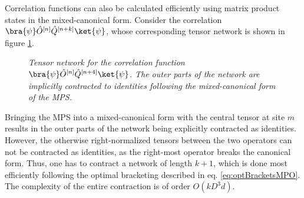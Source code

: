 Correlation functions can also be calculated efficiently using matrix product states in the mixed-canonical form. Consider the correlation $\bra{\psi} \hat{O}^{[n]} \hat{Q}^{[n+k]} \ket{\psi}$, whose corresponding tensor network is shown in figure \ref{fig:CorrelationFunction}.
\begin{figure}[h!]
	\centering
	
	\caption{\textit{Tensor network for the correlation function $\bra{\psi} \hat{O}^{[n]} \hat{Q}^{[n+4]} \ket{\psi}$. The outer parts of the network are implicitly contracted to identities following the mixed-canonical form of the MPS.}}
	\label{fig:CorrelationFunction}
\end{figure}
Bringing the MPS into a mixed-canonical form with the central tensor at site $m$ results in the outer parts of the network being explicitly contracted as identities. However, the otherwise right-normalized tensors between the two operators can not be contracted as identities, as the right-most operator breaks the canonical form. Thus, one has to contract a network of length $k+1$, which is done most efficiently following the optimal bracketing described in eq. \eqref{eq:optBracketsMPO}. The complexity of the entire contraction is of order $O(k D^3 d)$.

